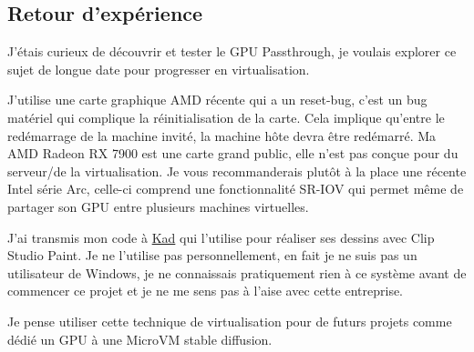 \documentclass[a4paper,11pt]{article}
\begin{document}
\begin{blogmain}
\newpage
\section{Retour d'expérience}
J'étais curieux de découvrir et tester le GPU Passthrough, je voulais explorer ce sujet de longue date pour progresser en virtualisation.

J'utilise une carte graphique AMD récente qui a un reset-bug, c'est un bug matériel qui complique la réinitialisation de la carte. Cela implique qu'entre le redémarrage de la machine invité, la machine hôte devra être redémarré.
Ma AMD Radeon RX 7900 est une carte grand public, elle n'est pas conçue pour du serveur/de la virtualisation.
Je vous recommanderais plutôt à la place une récente Intel série Arc, celle-ci comprend une fonctionnalité SR-IOV qui permet même de partager son GPU entre plusieurs machines virtuelles.

J'ai transmis mon code à  \href{https://gitlab.com/noodles-yaonam}{Kad} qui l'utilise pour réaliser ses dessins avec Clip Studio Paint.
Je ne l'utilise pas personnellement, en fait je ne suis pas un utilisateur de Windows, je ne connaissais pratiquement rien à ce système avant de commencer ce projet et je ne me sens pas à l'aise avec cette entreprise.

Je pense utiliser cette technique de virtualisation pour de futurs projets comme dédié un GPU à une MicroVM stable diffusion.

\end{blogmain}
\end{document}
